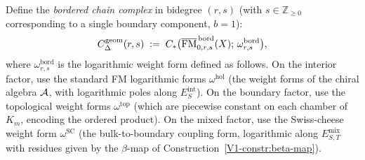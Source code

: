 \begin{definition}
\label{def:bordered-chains}
Define the \emph{bordered chain complex} in bidegree $(r,s)$
(with $s\in\mathbb Z_{\ge 0}$ corresponding to a single boundary
component, $b=1$):
\[
C_\Delta^{\mathrm{geom}}(r,s)
\;:=\;
C_*\bigl(
\overline{\mathrm{FM}}^{\,\mathrm{bord}}_{0,r,s}(X);\,
\omega^{\mathrm{bord}}_{r,s}
\bigr),
\]
where $\omega^{\mathrm{bord}}_{r,s}$ is the logarithmic weight
form defined as follows. On the interior factor, use the standard
FM logarithmic forms $\omega^{\mathrm{hol}}$ (the weight forms
of the chiral algebra $\mathcal{A}$, with logarithmic poles along
$E_S^{\mathrm{int}}$). On the boundary factor, use the topological
weight forms $\omega^{\mathrm{top}}$ (which are piecewise constant
on each chamber of $K_m$, encoding the ordered product). On the
mixed factor, use the Swiss-cheese weight form
$\omega^{\mathrm{SC}}$ (the bulk-to-boundary coupling form,
logarithmic along $E_{S,T}^{\mathrm{mix}}$ with residues given by
the $\beta$-map of Construction~\ref*{V1-constr:beta-map}).
\end{definition}

